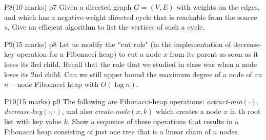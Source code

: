 \documentclass[a4paper, 11pt]{article}
\begin{document}
\begin{problem}{%
		P8\hfill  (10 marks)
	}{p7%
	}
Given a directed graph $G=(V,E)$ with weights on the edges, and which has a negative-weight directed cycle that is reachable from the source $s$, Give an efficient algorithm to list the vertices of such a cycle.
\end{problem}
\solve{
}



\begin{problem}{%
	P9\hfill  (15 marks)
}{p8%
}
Let us modify the ``cut rule" (in the implementation of decrease-key operation for a Fibonacci heap) to cut a node $x$ from its parent as soon as it loses its 3rd child. Recall that the rule that we studied in class was when a node loses its 2nd child. Can we still upper bound the maximum degree of a node of an $n-$node Fibonacci heap with $O(\log n)$.
\end{problem}
\solve{
}



\begin{problem}{%
	P10\hfill  (15 marks)
}{p9%
}
The following are Fibonacci-heap operations: \textit{extract-min}$(\cdot)$, \textit{decrease-key}$(\cdot,\cdot)$, and also \textit{create-node}$(x,k)$ which creates a node $x$ in th root list with key value $k$. Show a sequence of these operations that results in a Fibonacci heap consisting of just one tree that is a linear chain of $n$ nodes.
\end{problem}
\solve{
}
\end{document}
